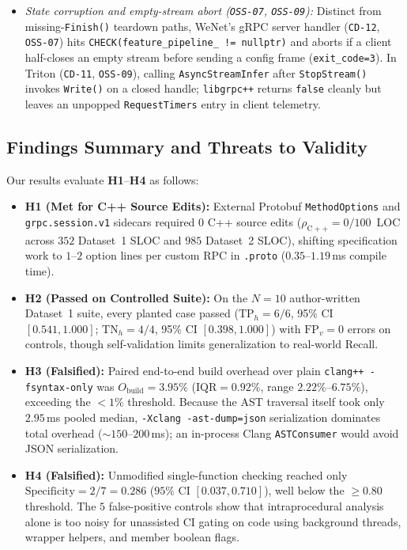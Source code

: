 \begin{itemize}
    \item \emph{State corruption and empty-stream abort (\texttt{OSS-07}, \texttt{OSS-09}):} Distinct from missing-\texttt{Finish()} teardown paths, WeNet's gRPC server handler (\texttt{CD-12}, \texttt{OSS-07}) hits \texttt{CHECK(\allowbreak feature\_\allowbreak pipeline\_ != nullptr)} and aborts if a client half-closes an empty stream before sending a config frame (\texttt{exit\_\allowbreak code=3}). In Triton (\texttt{CD-11}, \texttt{OSS-09}), calling \texttt{AsyncStream\allowbreak Infer} after \texttt{StopStream()} invokes \texttt{Write()} on a closed handle; \texttt{libgrpc++} returns \texttt{false} cleanly but leaves an unpopped \texttt{Request\allowbreak Timers} entry in client telemetry.
\end{itemize}

\subsection{Findings Summary and Threats to Validity}
\label{sec:discussion-conclusion}

Our results evaluate \textbf{H1}--\textbf{H4} as follows:
\begin{itemize}
    \item \textbf{H1 (Met for C++ Source Edits):} External Protobuf \texttt{MethodOptions} and \texttt{grpc.session.v1} sidecars required $0$ C++ source edits ($\rho_{\mathrm{C++}}=0/100$~LOC across $352$ Dataset~1 SLOC and $985$ Dataset~2 SLOC), shifting specification work to $1$--$2$ option lines per custom RPC in \texttt{.proto} ($0.35$--$1.19$\,ms compile time).
    \item \textbf{H2 (Passed on Controlled Suite):} On the $N=10$ author-written Dataset~1 suite, every planted case passed ($\mathrm{TP}_h=6/6$, 95\% CI $[0.541, 1.000]$; $\mathrm{TN}_h=4/4$, 95\% CI $[0.398, 1.000]$) with $\mathrm{FP}_v=0$ errors on controls, though self-validation limits generalization to real-world Recall.
    \item \textbf{H3 (Falsified):} Paired end-to-end build overhead over plain \texttt{clang++ -fsyntax-only} was $O_{\mathrm{build}}=3.95\%$ ($\mathrm{IQR}=0.92\%$, range $2.22\%$--$6.75\%$), exceeding the $<1\%$ threshold. Because the AST traversal itself took only $2.95$\,ms pooled median, \texttt{-Xclang -ast-dump=json} serialization dominates total overhead ($\sim 150$--$200$\,ms); an in-process Clang \texttt{ASTConsumer} would avoid JSON serialization.
    \item \textbf{H4 (Falsified):} Unmodified single-function checking reached only $\mathrm{Specificity}=2/7=0.286$ ($95\%$ CI $[0.037, 0.710]$), well below the $\ge 0.80$ threshold. The $5$ false-positive controls show that intraprocedural analysis alone is too noisy for unassisted CI gating on code using background threads, wrapper helpers, and member boolean flags.
\end{itemize}

